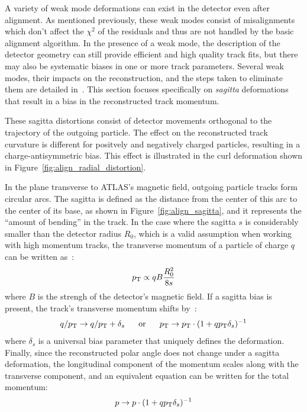 A variety of weak mode deformations can exist in the detector even after alignment.
As mentioned previously, these weak modes consist of misalignments which don't affect the $\chi^2$ of the residuals and thus are not handled by the basic alignment algorithm.
In the presence of a weak mode, the description of the detector geometry can still provide efficient and high quality track fits, but there may also be systematic biases in one or more track parameters.
Several weak modes, their impacts on the reconstruction, and the steps taken to eliminate them are detailed in~\cite{2014.alignment-performance-8tev, 2012.alignment-systematics}. 
This section focuses specifically on \emph{sagitta} deformations that result in a bias in the reconstructed track momentum.

These sagitta distortions consist of detector movements orthogonal to the trajectory of the outgoing particle.
The effect on the reconstructed track curvature is different for positvely and negatively charged particles, resulting in a charge-antisymmetric bias.
This effect is illustrated in the curl deformation shown in Figure~\ref{fig:align_radial_distortion}.

In the plane transverse to ATLAS's magnetic field, outgoing particle tracks form circular arcs.
The sagitta is defined as the distance from the center of this arc to the center of its base, as shown in Figure~\ref{fig:align_sagitta}, and it represents the ``amount of bending'' in the track.
In the case where the sagitta $s$ is considerably smaller than the detector radius $R_0$, which is a valid assumption when working with high momentum tracks, the transverse momentum of a particle of charge $q$ can be written as~\cite{2018.alignment-radial-distortions}:
\begin{equation}
  \pt \propto q B \frac{R_0^2}{8s}
  \label{eq:align_pt_sagitta}
\end{equation}
where $B$ is the strengh of the detector's magnetic field.
If a sagitta bias is present, the track's transverse momentum shifts by~\cite{2012.alignment-systematics}:
\begin{equation}
  q/\pt\rightarrow q/\pt+\delta_s ~~~~~\textrm{or}~~~~~ \pt\rightarrow \pt\cdot(1+q\pt\delta_s)^{-1}
  \label{eq:align_pt_sagitta_bias}
\end{equation}
where $\delta_s$ is a universal bias parameter that uniquely defines the deformation.
Finally, since the reconstructed polar angle does not change under a sagitta deformation, the longitudinal component of the momentum scales along with the transverse component, and an equivalent equation can be written for the total momentum:
\begin{equation}
  p\rightarrow p\cdot(1+q\pt\delta_s)^{-1}
  \label{eq:align_p_sagitta_bias}
\end{equation}

